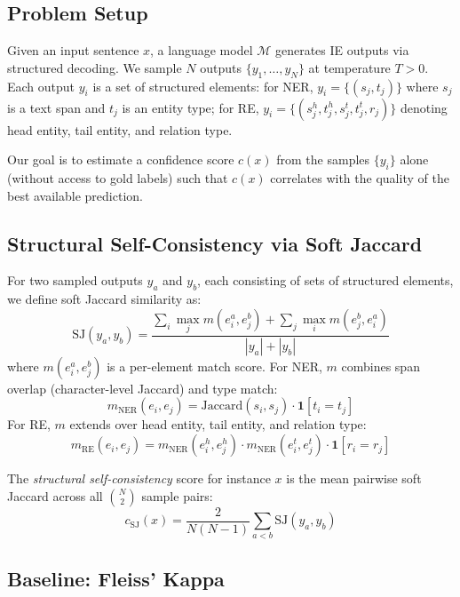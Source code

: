 \documentclass[11pt,a4paper]{article}
\newcommand{\SJ}{\mathrm{SJ}}
\begin{document}
\subsection{Problem Setup}

Given an input sentence $x$, a language model $\mathcal{M}$ generates IE outputs via structured decoding. We sample $N$ outputs $\{y_1, \ldots, y_N\}$ at temperature $T > 0$. Each output $y_i$ is a set of structured elements: for NER, $y_i = \{(s_j, t_j)\}$ where $s_j$ is a text span and $t_j$ is an entity type; for RE, $y_i = \{(s^h_j, t^h_j, s^t_j, t^t_j, r_j)\}$ denoting head entity, tail entity, and relation type.

Our goal is to estimate a confidence score $c(x)$ from the samples $\{y_i\}$ alone (without access to gold labels) such that $c(x)$ correlates with the quality of the best available prediction.

\subsection{Structural Self-Consistency via Soft Jaccard}

For two sampled outputs $y_a$ and $y_b$, each consisting of sets of structured elements, we define soft Jaccard similarity as:
\begin{equation}
\SJ(y_a, y_b) = \frac{\sum_{i} \max_{j} m(e^a_i, e^b_j) + \sum_{j} \max_{i} m(e^b_j, e^a_i)}{|y_a| + |y_b|}
\end{equation}
where $m(e^a_i, e^b_j)$ is a per-element match score. For NER, $m$ combines span overlap (character-level Jaccard) and type match:
\begin{equation}
m_{\text{NER}}(e_i, e_j) = \text{Jaccard}(s_i, s_j) \cdot \mathbf{1}[t_i = t_j]
\end{equation}
For RE, $m$ extends over head entity, tail entity, and relation type:
\begin{equation}
m_{\text{RE}}(e_i, e_j) = m_{\text{NER}}(e^h_i, e^h_j) \cdot m_{\text{NER}}(e^t_i, e^t_j) \cdot \mathbf{1}[r_i = r_j]
\end{equation}

The \emph{structural self-consistency} score for instance $x$ is the mean pairwise soft Jaccard across all $\binom{N}{2}$ sample pairs:
\begin{equation}
c_{\SJ}(x) = \frac{2}{N(N-1)} \sum_{a < b} \SJ(y_a, y_b)
\end{equation}

\subsection{Baseline: Fleiss' Kappa}
\end{document}
